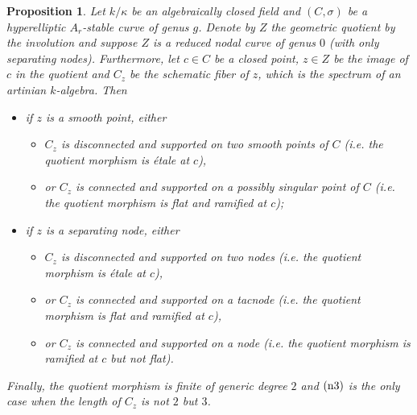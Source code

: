 \documentclass{alggeom}
\numberwithin{equation}{section}
\numberwithin{subsection}{section}
\newtheorem{proposition}[theorem]{Proposition}
\theoremstyle{definition}
\theoremstyle{remark}
\begin{document}
\begin{proposition}\label{prop:description-quotient}
	Let $k/\kappa$ be an algebraically closed field and $(C,\sigma)$ be a hyperelliptic $A_r$-stable curve of genus $g$. Denote by $Z$ the geometric quotient by the involution and suppose $Z$ is a reduced nodal curve of genus $0$ (with only separating nodes). Furthermore, let $c\in C$ be a closed point, $z \in Z$ be the image of $c$ in the quotient and $C_z$ be the schematic fiber of $z$, which is the spectrum of an artinian $k$-algebra. Then
	
	\begin{itemize}
		\item if $z$ is a smooth point, either 
		\begin{itemize}
			\item[(s1)] $C_z$ is disconnected and supported on two smooth points of $C$ (i.e. the quotient morphism is \'etale at $c$),
			\item[(s2)] or $C_z$ is connected and supported on a possibly singular point of $C$ (i.e. the quotient morphism is flat and ramified at $c$); 
		\end{itemize}
		\item if $z$ is a separating node, either
		\begin{itemize}
			\item[(n1)] $C_z$ is disconnected and supported on two nodes (i.e. the quotient morphism is \'etale at $c$),
			\item[(n2)] or $C_z$ is connected and supported on a tacnode (i.e. the quotient morphism is flat and ramified at $c$),
			\item[(n3)] or $C_z$ is connected and supported on a node (i.e. the quotient morphism is ramified at $c$ but not flat). 
		\end{itemize}
	\end{itemize} 

Finally, the quotient morphism is finite of generic degree $2$ and ${\rm (n3)}$ is the only case when the length of $C_z$ is not $2$ but $3$. 
\end{proposition}
\end{document}
